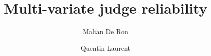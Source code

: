 \documentclass[10pt]{beamer}
\title{Multi-variate judge reliability}
\author[Malian DR, Quentin L]{
  \small
  Malian De Ron
 \and
  Quentin Laurent
}
\begin{document}
\begin{frame}
  \maketitle
\end{frame}


\end{document}
